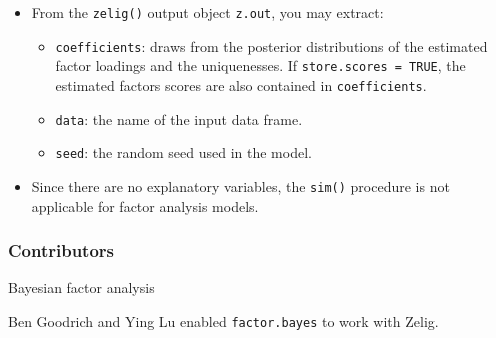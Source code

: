 \begin{itemize}
\item From the \texttt{zelig()} output object \texttt{z.out}, you may extract:

\begin{itemize}
\item \texttt{coefficients}: draws from the posterior distributions
of the estimated factor loadings and the uniquenesses.  If
\texttt{store.scores = TRUE}, the estimated factors scores are also
contained in \texttt{coefficients}.

\item \texttt{data}: the name of the input data frame.
\item \texttt{seed}: the random seed used in the model.   

\end{itemize}

\item Since there are no explanatory variables, the \texttt{sim()}
procedure is not applicable for factor analysis models.

\end{itemize}

\subsubsection{Contributors}
Bayesian factor analysis 

\noindent Ben Goodrich and Ying Lu enabled \texttt{factor.bayes} to work with Zelig.


